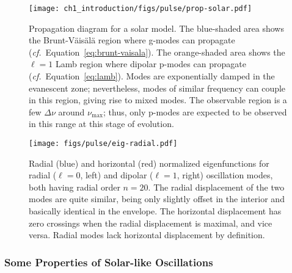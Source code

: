 \begin{figure}
    \centering
    \texttt{[image: ch1\_introduction/figs/pulse/prop-solar.pdf]}
    \caption[Propagation diagram]{Propagation diagram for a solar model. 
    The blue-shaded area shows the Brunt-V\"ais\"al\"a region where g-modes can propagate (\emph{cf.}~Equation~\ref{eq:brunt-vaisala}). 
    The orange-shaded area shows the ${\ell=1}$ Lamb region where dipolar p-modes can propagate (\emph{cf.}~Equation~\ref{eq:lamb}). 
    Modes are exponentially damped in the evanescent zone; nevertheless, modes of similar frequency can couple in this region, giving rise to mixed modes. 
    The observable region is a few ${\Delta\nu}$ around $\nu_{\max}$; thus, only p-modes are expected to be observed in this range at this stage of evolution. 
    \label{fig:propagation}}
\end{figure}




\begin{figure}
    \centering
    \texttt{[image: figs/pulse/eig-radial.pdf]}%
    \caption[Eigenfunctions]{Radial (blue) and horizontal (red) normalized eigenfunctions for radial (${\ell=0}$, left) and dipolar (${\ell=1}$, right) oscillation modes, both having radial order ${n=20}$. 
    The radial displacement of the two modes are quite similar, being only slightly offset in the interior and basically identical in the envelope. 
    The horizontal displacement has zero crossings when the radial displacement is maximal, and vice versa. 
    Radial modes lack horizontal displacement by definition. 
    \label{fig:eigenfunctions}}
\end{figure}



\subsubsection*{Some Properties of Solar-like Oscillations}

